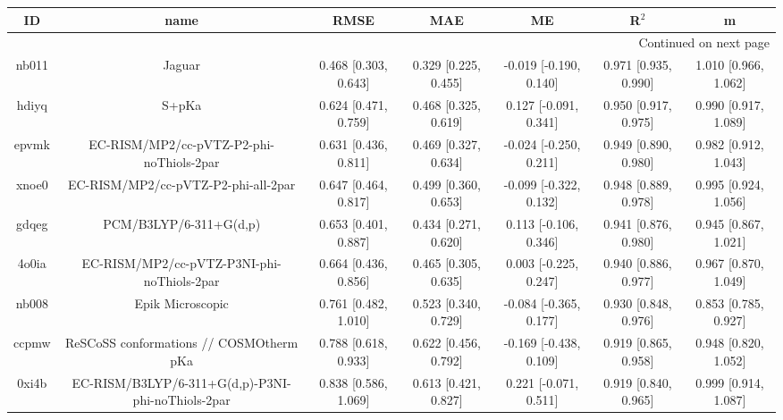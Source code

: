\documentclass{article}
\begin{document}
\begin{center}
\begin{longtable}{|ccccccc|}
\toprule
    ID &                                               name &                  RMSE &                   MAE &                       ME &                 R$^2$ &                      m \\
\midrule
\endhead
\midrule
\multicolumn{7}{r}{{Continued on next page}} \\
\midrule
\endfoot

\bottomrule
\endlastfoot
 nb011 &                                             Jaguar &  0.468 [0.303, 0.643] &  0.329 [0.225, 0.455] &   -0.019 [-0.190, 0.140] &  0.971 [0.935, 0.990] &   1.010 [0.966, 1.062] \\
 hdiyq &                                              S+pKa &  0.624 [0.471, 0.759] &  0.468 [0.325, 0.619] &    0.127 [-0.091, 0.341] &  0.950 [0.917, 0.975] &   0.990 [0.917, 1.089] \\
 epvmk &           EC-RISM/MP2/cc-pVTZ-P2-phi-noThiols-2par &  0.631 [0.436, 0.811] &  0.469 [0.327, 0.634] &   -0.024 [-0.250, 0.211] &  0.949 [0.890, 0.980] &   0.982 [0.912, 1.043] \\
 xnoe0 &                EC-RISM/MP2/cc-pVTZ-P2-phi-all-2par &  0.647 [0.464, 0.817] &  0.499 [0.360, 0.653] &   -0.099 [-0.322, 0.132] &  0.948 [0.889, 0.978] &   0.995 [0.924, 1.056] \\
 gdqeg &                             PCM/B3LYP/6-311+G(d,p) &  0.653 [0.401, 0.887] &  0.434 [0.271, 0.620] &    0.113 [-0.106, 0.346] &  0.941 [0.876, 0.980] &   0.945 [0.867, 1.021] \\
 4o0ia &         EC-RISM/MP2/cc-pVTZ-P3NI-phi-noThiols-2par &  0.664 [0.436, 0.856] &  0.465 [0.305, 0.635] &    0.003 [-0.225, 0.247] &  0.940 [0.886, 0.977] &   0.967 [0.870, 1.049] \\
 nb008 &                                   Epik Microscopic &  0.761 [0.482, 1.010] &  0.523 [0.340, 0.729] &   -0.084 [-0.365, 0.177] &  0.930 [0.848, 0.976] &   0.853 [0.785, 0.927] \\
 ccpmw &            ReSCoSS conformations // COSMOtherm pKa &  0.788 [0.618, 0.933] &  0.622 [0.456, 0.792] &   -0.169 [-0.438, 0.109] &  0.919 [0.865, 0.958] &   0.948 [0.820, 1.052] \\
 0xi4b &  EC-RISM/B3LYP/6-311+G(d,p)-P3NI-phi-noThiols-2par &  0.838 [0.586, 1.069] &  0.613 [0.421, 0.827] &    0.221 [-0.071, 0.511] &  0.919 [0.840, 0.965] &   0.999 [0.914, 1.087] \\

\end{longtable}
\end{center}
\end{document}
